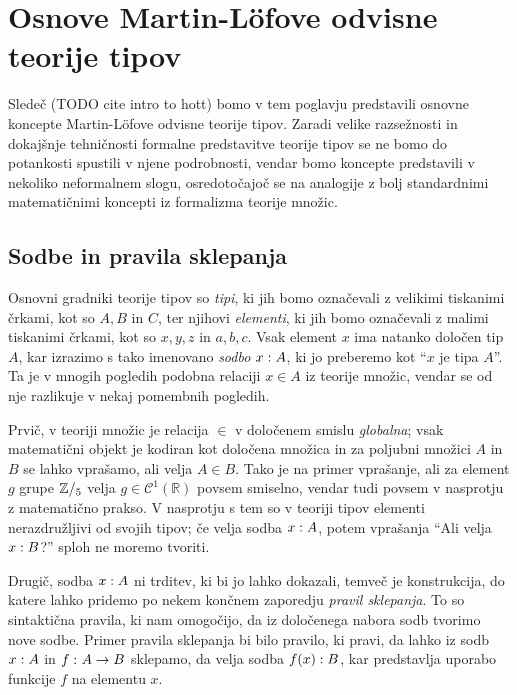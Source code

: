 \section{Osnove Martin-Löfove odvisne teorije tipov}

Sledeč (TODO cite intro to hott) bomo v tem poglavju predstavili osnovne koncepte
Martin-Löfove odvisne teorije tipov. Zaradi velike razsežnosti in dokajšnje tehničnosti
formalne predstavitve teorije tipov se ne bomo do potankosti spustili v njene podrobnosti,
vendar bomo koncepte predstavili v nekoliko neformalnem slogu, osredotočajoč se na
analogije z bolj standardnimi matematičnimi koncepti iz formalizma teorije množic.

\subsection{Sodbe in pravila sklepanja}

Osnovni gradniki teorije tipov so \emph{tipi}, ki jih bomo označevali z velikimi tiskanimi
črkami, kot so \(A, B\) in \(C\), ter njihovi \emph{elementi}, ki jih bomo označevali
z malimi tiskanimi črkami, kot so \(x, y, z\) in \(a, b, c\). Vsak element \(x\) ima
natanko določen tip \(A\), kar izrazimo s tako imenovano \emph{sodbo}
\(x : A\), ki jo preberemo kot ``\(x\) je tipa \(A\)''.
Ta je v mnogih pogledih podobna relaciji \(x \in A\) iz teorije množic, vendar se od
nje razlikuje v nekaj pomembnih pogledih.

Prvič, v teoriji množic je relacija \(\in\) v določenem smislu \emph{globalna};
vsak matematični objekt je kodiran kot določena množica in za poljubni množici \(A\) in
\(B\) se lahko vprašamo, ali velja \(A \in B\). Tako je na primer vprašanje, ali za element
\(g\) grupe \(\mathbb Z/_{5}\) velja \(g \in \mathcal{C}^{1}(\mathbb{R})\) povsem smiselno,
vendar tudi povsem v nasprotju z matematično prakso.
V nasprotju s tem so v teoriji tipov elementi nerazdružljivi od svojih tipov; če velja
sodba \(x : A\), potem vprašanja ``Ali velja \(x : B\)?''
sploh ne moremo tvoriti.

Drugič, sodba \(x : A\) ni trditev, ki bi jo lahko dokazali, temveč je
konstrukcija, do katere lahko pridemo po nekem končnem zaporedju \emph{pravil sklepanja}.
To so sintaktična pravila, ki nam omogočijo, da iz določenega nabora
sodb tvorimo nove sodbe. Primer pravila sklepanja bi bilo pravilo, ki pravi, da
lahko iz sodb \(x : A\) in \(f \,\colon A \to B\) sklepamo, da velja
sodba \(f(x) : B\), kar predstavlja uporabo funkcije \(f\)
na elementu \(x\).

